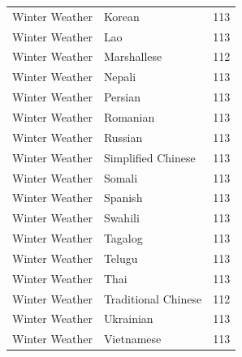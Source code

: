 \begin{longtable}{p{3cm} p{3cm} r}
Winter Weather & Korean & 113 \\
Winter Weather & Lao & 113 \\
Winter Weather & Marshallese & 112 \\
Winter Weather & Nepali & 113 \\
Winter Weather & Persian & 113 \\
Winter Weather & Romanian & 113 \\
Winter Weather & Russian & 113 \\
Winter Weather & Simplified Chinese & 113 \\
Winter Weather & Somali & 113 \\
Winter Weather & Spanish & 113 \\
Winter Weather & Swahili & 113 \\
Winter Weather & Tagalog & 113 \\
Winter Weather & Telugu & 113 \\
Winter Weather & Thai & 113 \\
Winter Weather & Traditional Chinese & 112 \\
Winter Weather & Ukrainian & 113 \\
Winter Weather & Vietnamese & 113 \\
\end{longtable}